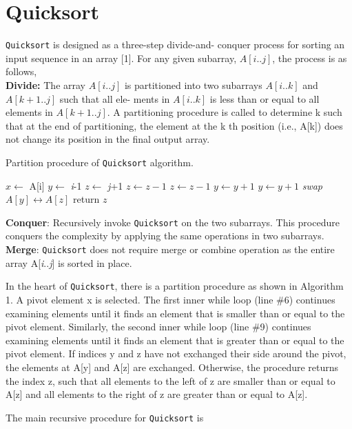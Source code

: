 \documentclass[a4paper, 10pt,twocolumn]{article}
\begin{document}
\section{Quicksort}
\texttt{Quicksort} is designed as a three-step divide-and-
conquer process for sorting an input sequence in
an array [1]. For any given subarray, $A[i..j]$, the
process is as follows, \\
\textbf{Divide:} The array $A[i..j]$ is partitioned into two
subarrays $A[i..k]$ and $A[k + 1..j]$ such that all ele-
ments in $A[i..k]$ is less than or equal to all elements
in $A[k + 1..j]$. A partitioning procedure is called to
determine k such that at the end of partitioning,
the element at the k th position (i.e., A[k]) does not
change its position in the final output array.

\begin{algorithm}
  \caption{Partition procedure of \texttt{Quicksort} algorithm.}
  \label{algo:ins_sort1}
  \begin{algorithmic}[1]
     \newline
      \newline
      \State $x \leftarrow$ A[i]
      \State $y \leftarrow$ \textit{i}-1
      \State $z \leftarrow$ \textit{j}+1
          \State $z \leftarrow z-1$
            \State $z \leftarrow z-1$
         \EndWhile
         \State $y \leftarrow y + 1$
            \State $y \leftarrow y+1$
          \EndWhile
            \State \textit{swap} $A[y] \leftrightarrow A[z]$
          \Else
            \State return $z$
          \EndIf
      \EndWhile
     \EndProcedure
  \end{algorithmic}
\end{algorithm}

\textbf{Conquer}: Recursively invoke \texttt{Quicksort} on the two subarrays. This
procedure conquers the complexity by applying the same operations
in two subarrays.
\\
\textbf{Merge}: \texttt{Quicksort} does not require merge or combine operation
as the entire array A[\textit{i}..\textit{j}] is sorted in place.
\par
In the heart of \texttt{Quicksort}, there is a partition procedure as shown in
Algorithm 1. A pivot element x is selected. The first inner while
loop (line \#6) continues examining elements until it finds an element that
is smaller than or equal to the pivot element. Similarly, the second inner
while loop (line \#9) continues examining elements until it finds an
element that is greater than or equal to the pivot element. If indices
y and z have not exchanged their side around the pivot, the elements
at A[y] and A[z] are exchanged. Otherwise, the procedure returns the
index z, such that all elements to the left of z are smaller than or
equal to A[z] and all elements to the right of z are greater than or
equal to A[z].
\par
The main recursive procedure for \texttt{Quicksort} is
\end{document}

